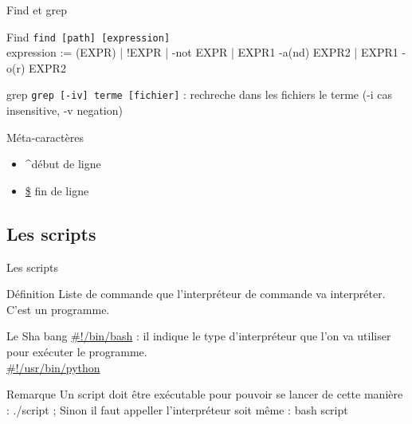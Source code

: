 \begin{frame}{Find et grep}
\begin{block}{Find}
\texttt{find [path] [expression]}\\
expression := (EXPR) | !EXPR | -not EXPR | EXPR1 -a(nd) EXPR2 | EXPR1 -o(r) EXPR2\\

\end{block}

\begin{block}{grep}
\texttt{grep [-iv] terme [fichier]} : rechreche dans les fichiers le terme (-i cas insensitive, -v negation)
\end{block}

\begin{alertblock}{Méta-caractères}
\begin{itemize}
\item \textasciicircum début de ligne
\item \url{$} fin de ligne
\end{itemize}
\end{alertblock}
\end{frame}

\subsection{Les scripts}
\begin{frame}{Les scripts}
\begin{block}{Définition}
Liste de commande que l'interpréteur de commande va interpréter. C'est un programme.
\end{block}

\begin{block}{Le Sha bang}
\url{\#!/bin/bash} : il indique le type d'interpréteur que l'on va utiliser pour exécuter le programme.\\
\url{\#!/usr/bin/python}
\end{block}

\begin{alertblock}{Remarque}
Un script doit être exécutable pour pouvoir se lancer de cette manière : ./script ; Sinon il faut appeller l'interpréteur soit même : bash script
\end{alertblock}
\end{frame}

